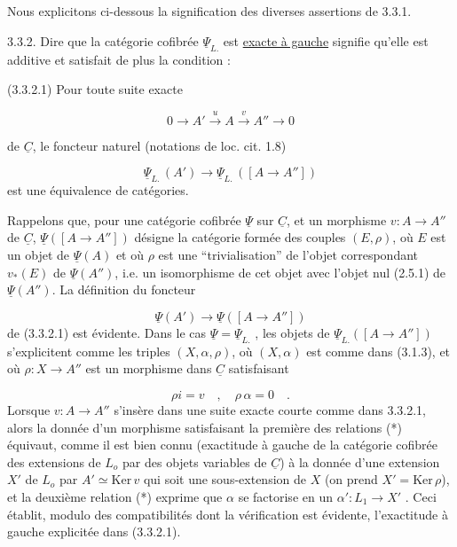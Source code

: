 Nous explicitons ci-dessous la signification des diverses assertions de 3.3.1.

3.3.2. Dire que la catégorie cofibrée $\underline{\Psi}_{L.}$ est \underline{exacte à gauche} signifie qu'elle est additive et satisfait de plus la condition :

(3.3.2.1) Pour toute suite exacte

\begin{equation*}
0 \longrightarrow A' \stackrel{u}{\longrightarrow} A \stackrel{v}{\longrightarrow} A'' \longrightarrow 0 
\end{equation*}


 de $\underline{C}$, le foncteur naturel (notations de loc. cit. 1.8)

\begin{equation*}
\underline{\Psi}_{L.}\,(A') \longrightarrow \underline{\Psi}_{L.}\,([A \longrightarrow A''])
\end{equation*}
est une équivalence de catégories.

Rappelons que, pour une catégorie cofibrée $\underline{\Psi}$ sur $\underline{C}$, et un morphisme $v : A \longrightarrow A''$ de $\underline{C}$, $\underline{\Psi}([A \longrightarrow A''])$ désigne la catégorie formée des couples $(E,\rho)$, où $E$ est un objet de $\underline{\Psi}(A)$ et où $\rho$ est une ``trivialisation'' de l'objet correspondant $v_*(E)$ de $\underline{\Psi}(A'')$, i.e. un isomorphisme de cet objet avec l'objet nul (2.5.1) de $\underline{\Psi}(A'')$. La définition du foncteur

\begin{equation*}
\underline{\Psi}(A') \longrightarrow \underline{\Psi}([A \longrightarrow A''])
\end{equation*}
de (3.3.2.1) est évidente. Dans le cas $\underline{\Psi} = \underline{\Psi}_{L.}$ , les objets de $\underline{\Psi}_{L.}([A \longrightarrow A''])$ s'explicitent comme les triples $(X,\alpha,\rho)$, où $(X,\alpha)$ est comme dans (3.1.3), et où $\rho : X \longrightarrow A''$ est un morphisme dans $\underline{C}$ satisfaisant

\begin{equation}\tag{*}
\rho i = v \quad , \quad \rho\, \alpha = 0 \quad .
\end{equation}
Lorsque $v: A \longrightarrow A''$ s'insère dans une suite exacte courte comme dans 3.3.2.1, alors la donnée d'un morphisme satisfaisant la première des relations (*) équivaut, comme il est bien connu (exactitude à gauche de la catégorie cofibrée des extensions de $L_o$ par des objets variables de $\underline{C}$) à la donnée d'une extension $X'$ de $L_o$ par $A' \simeq \mathrm{Ker}\, v$ qui soit une sous-extension de $X$ (on prend $X' = \mathrm{Ker}\, \rho$), et la deuxième relation (*) exprime que $\alpha$ se factorise en un $\alpha' : L_1 \longrightarrow X'$ . Ceci établit, modulo des compatibilités dont la vérification est évidente, l'exactitude à gauche explicitée dans (3.3.2.1).


